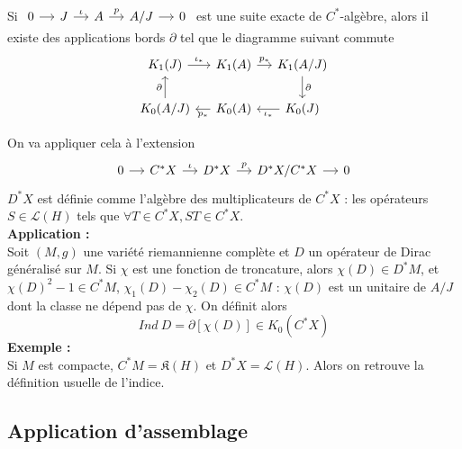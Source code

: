 \documentclass{beamer}
\begin{document}
\begin{frame}
\begin{thm}
Si $\begin{tikzcd}[ampersand replacement=\&,column sep = small]
0 \arrow{r} \& J \arrow{r}{\iota} \& A\arrow{r}{p} \& A/J\arrow{r} \& 0  
\end{tikzcd}$ est une suite exacte de $C^*$-algèbre, alors il existe des applications bords $\partial$ tel que le diagramme suivant commute
\[\begin{tikzcd}[ampersand replacement=\&,column sep = small]
 K_1(J)\arrow{r}{\iota_*}\& K_1(A)\arrow{r}{p_*}\& K_1(A/J)\arrow{d}{\partial}\\
K_0(A/J)\arrow{u}{\partial}\& K_0(A)\arrow{l}{p_*}\& K_0(J)\arrow{l}{\iota_*}
\end{tikzcd}\]
\end{thm}
\end{frame}

\begin{frame}
On va appliquer cela à l'extension \[\begin{tikzcd}[ampersand replacement=\&,column sep = small]
0 \arrow{r} \& C^*X \arrow{r}{\iota} \& D^*X\arrow{r}{p} \& D^*X/C^*X\arrow{r} \& 0  
\end{tikzcd}\]
$D^* X$ est définie comme l'algèbre des multiplicateurs de $C^*X$ : les opérateurs $S\in \mathcal L(H)$ tels que $\forall T\in C^*X, ST\in C^* X$.\\
\textbf{Application :}\\
Soit $(M,g)$ une variété riemannienne complète et $D$ un opérateur de Dirac généralisé sur $M$. Si $\chi$ est une fonction de troncature, alors $\chi(D)\in D^*M$, et $\chi(D)^2-1\in C^*M$, $\chi_1(D)-\chi_2(D)\in C^*M$ : $\chi(D)$ est un unitaire de $A/J$ dont la classe ne dépend pas de $\chi$. On définit alors 
\[Ind \ D = \partial [\chi(D)] \in K_0(C^*X)\]
\textbf{Exemple :}\\
Si $M$ est compacte, $C^*M = \mathfrak K(H)$ et $D^*X = \mathcal L(H)$. Alors on retrouve la définition usuelle de l'indice.
\end{frame}

\subsection{Application d'assemblage}
\begin{frame}
\tableofcontents[currentsubsection]
\end{frame}
\end{document}
